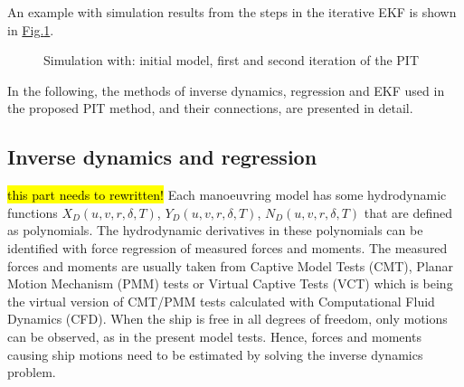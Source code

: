 \documentclass[review]{elsarticle}
\begin{document}
\sphinxAtStartPar
An example with simulation results from the steps in the iterative EKF is shown in \hyperref[\detokenize{01.01_method:iterations}]{Fig.\@ \ref{\detokenize{01.01_method:iterations}}}.

\begin{figure}[H]
\centering
\capstart

\noindent{}
\caption{Simulation with: initial model, first and second iteration of the PIT}\label{\detokenize{01.01_method:iterations}}\end{figure}

\sphinxAtStartPar
In the following, the methods of inverse dynamics, regression and EKF used in the proposed PIT method, and their connections, are presented in detail.


\subsection{Inverse dynamics and regression}\hl{this part needs to rewritten!}
\label{\detokenize{03.01_inverse_dynamics:inverse-dynamics-and-regression}}\label{\detokenize{03.01_inverse_dynamics::doc}}
\sphinxAtStartPar
Each manoeuvring model has some hydrodynamic functions \(X_D(u,v,r,\delta,T)\), \(Y_D(u,v,r,\delta,T)\), \(N_D(u,v,r,\delta,T)\) that are defined as polynomials. The hydrodynamic derivatives in these polynomials can be identified with force regression of measured forces and moments. The measured forces and moments are usually taken from Captive Model Tests (CMT), Planar Motion Mechanism (PMM) tests or Virtual Captive Tests (VCT) which is being the virtual version of CMT/PMM tests calculated with Computational Fluid Dynamics (CFD). When the ship is free in all degrees of freedom, only motions can be observed, as in the present model tests. Hence, forces and moments causing ship motions need to be estimated by solving the inverse dynamics problem.
\end{document}

